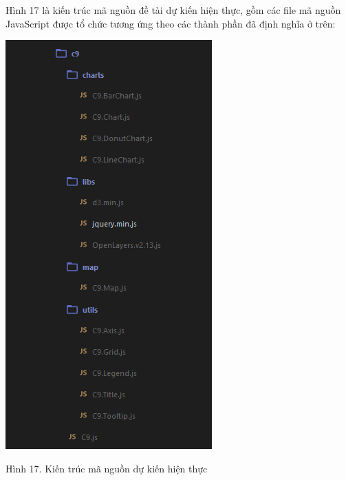 \documentclass[12pt,a4paper]{article}
\begin{document}
Hình 17 là kiến trúc mã nguồn đề tài dự kiến hiện thực, gồm các file mã nguồn JavaScript được tổ chức tương ứng theo các thành phần đã định nghĩa ở trên:

	\begin{center}
    \includegraphics[scale=.8]{image/api_model}
    
    Hình 17. Kiến trúc mã nguồn dự kiến hiện thực
    \end{center}
\end{document}
